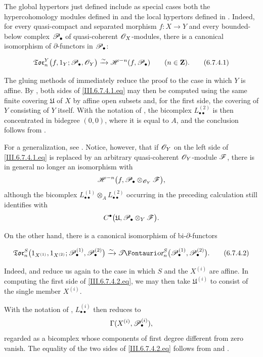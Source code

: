 \begin{remark}[6.7.4]
\label{III.6.7.4}
The global hypertors just defined include as special cases both
the hypercohomology modules defined in  and the
local hypertors defined in .  Indeed, for every
quasi-compact and separated morphism $f:X\to Y$ and every
bounded-below complex $\mathscr{P}_\bullet$ of quasi-coherent
$\mathscr{O}_X$-modules, there is a canonical isomorphism of
$\partial$-functors in $\mathscr{P}_\bullet$:
\begin{env}[6.7.4.1]
\label{III.6.7.4.1}
\[
  \mathfrak{Tor}_n^Y
  \bigl(
    f,1_Y;
    \mathscr{P}_\bullet,\mathscr{O}_Y
  \bigr)
  \xrightarrow{\sim}
  \mathscr{H}^{-n}(f,\mathscr{P}_\bullet)
  \qquad(n\in\mathbf Z).
  \tag{6.7.4.1}\label{III.6.7.4.1.eq}
\]
\end{env}
The gluing methods of  immediately reduce the
proof to the case in which $Y$ is affine.  By
, both sides of
\eqref{III.6.7.4.1.eq} may then be computed using the same
finite covering $\mathfrak U$ of $X$ by affine open subsets and,
for the first side, the covering of $Y$ consisting of $Y$
itself.  With the notation of , the bicomplex
$L_{\bullet\bullet}^{(2)}$ is then concentrated in bidegree
$(0,0)$, where it is equal to $A$, and the conclusion follows
from .

For a generalization, see .  Notice, however,
that if $\mathscr{O}_Y$ on the left side of
\eqref{III.6.7.4.1.eq} is replaced by an arbitrary
quasi-coherent $\mathscr{O}_Y$-module $\mathscr{F}$, there is in general no
longer an isomorphism with
\[
  \mathscr{H}^{-n}
  \bigl(
    f,\mathscr{P}_\bullet\otimes_{\mathscr{O}_Y}\mathscr{F}
  \bigr),
\]
although the bicomplex
$L_{\bullet\bullet}^{(1)}\otimes_A
 L_{\bullet\bullet}^{(2)}$ occurring in the preceding
calculation still identifies with
\[
  C^\bullet
  \bigl(
    \mathfrak U,
    \mathscr{P}_\bullet\otimes_Y\mathscr{F}
  \bigr).
\]

On the other hand, there is a canonical isomorphism of
bi-$\partial$-functors
\begin{env}[6.7.4.2]
\label{III.6.7.4.2}
\[
  \mathfrak{Tor}_n^S
  \bigl(
    1_{X^{(1)}},1_{X^{(2)}};
    \sh P_\bullet^{(1)},\sh P_\bullet^{(2)}
  \bigr)
  \xrightarrow{\sim}
  \shTor_n^S
  \bigl(
    \sh P_\bullet^{(1)},\sh P_\bullet^{(2)}
  \bigr).
  \tag{6.7.4.2}\label{III.6.7.4.2.eq}
\]
\end{env}
Indeed,  and  reduce us again to
the case in which $S$ and the $X^{(i)}$ are affine.  In
computing the first side of \eqref{III.6.7.4.2.eq}, we may then
take $\mathfrak U^{(i)}$ to consist of the single member
$X^{(i)}$.


With the notation of ,
$L_{\bullet\bullet}^{(i)}$ then reduces to
\[
  \Gamma(X^{(i)},\mathscr{P}_\bullet^{(i)}),
\]
regarded as a bicomplex whose components of first degree
different from zero vanish.  The equality of the two sides of
\eqref{III.6.7.4.2.eq} follows from  and
.
\end{remark}

